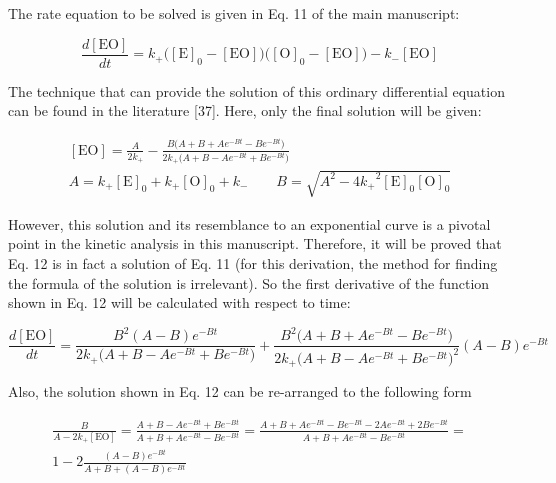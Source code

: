 \documentclass{article}
\begin{document}
The rate equation to be solved is given in Eq. 11 of the main manuscript:

\begin{equation}
\frac{d[\mathrm{EO}]}{dt} = k_+\bigl([\mathrm{E}]_0 - [\mathrm{EO}]\bigr)\bigl([\mathrm{O}]_0 - [\mathrm{EO}]\bigr) - k_-[\mathrm{EO}] \tag{11}
\end{equation}

The technique that can provide the solution of this ordinary differential equation can be found in the literature [37]. Here, only the final solution will be given:

\begin{equation}
\begin{gathered}
[\mathrm{EO}] = \frac{A}{2k_+} - \frac{B\bigl(A + B + Ae^{-Bt} - Be^{-Bt}\bigr)}{2k_+\bigl(A + B - Ae^{-Bt} + Be^{-Bt}\bigr)}\\[4pt]
A = k_+[\mathrm{E}]_0 + k_+[\mathrm{O}]_0 + k_- \qquad B = \sqrt{A^2 - 4{k_+}^2[\mathrm{E}]_0[\mathrm{O}]_0}
\end{gathered} \tag{12}
\end{equation}

However, this solution and its resemblance to an exponential curve is a pivotal point in the kinetic analysis in this manuscript. Therefore, it will be proved that Eq. 12 is in fact a solution of Eq. 11 (for this derivation, the method for finding the formula of the solution is irrelevant). So the first derivative of the function shown in Eq. 12 will be calculated with respect to time:

\begin{equation}
\frac{d[\mathrm{EO}]}{dt} = \frac{B^2(A - B)e^{-Bt}}{2k_+\bigl(A + B - Ae^{-Bt} + Be^{-Bt}\bigr)} + \frac{B^2\bigl(A + B + Ae^{-Bt} - Be^{-Bt}\bigr)}{2k_+\bigl(A + B - Ae^{-Bt} + Be^{-Bt}\bigr)^2}(A - B)e^{-Bt} \tag{S1}
\end{equation}

Also, the solution shown in Eq. 12 can be re-arranged to the following form

\begin{equation}
\begin{gathered}
\frac{B}{A - 2k_+[\mathrm{EO}]} = \frac{A + B - Ae^{-Bt} + Be^{-Bt}}{A + B + Ae^{-Bt} - Be^{-Bt}} = \frac{A + B + Ae^{-Bt} - Be^{-Bt} - 2Ae^{-Bt} + 2Be^{-Bt}}{A + B + Ae^{-Bt} - Be^{-Bt}} =\\[4pt]
1 - 2\frac{(A - B)e^{-Bt}}{A + B + (A - B)e^{-Bt}}
\end{gathered} \tag{S2}
\end{equation}
\end{document}
